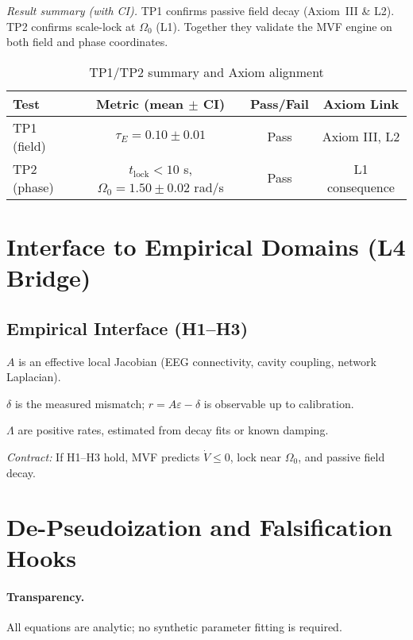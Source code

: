 \documentclass[12pt,a4paper]{article}
\begin{document}
\noindent\textit{Result summary (with CI).}
TP1 confirms passive field decay (Axiom~III \& L2). TP2 confirms scale-lock at \(\Omega_0\) (L1). Together they validate the MVF engine on both field and phase coordinates.

\begin{table}[h]
\centering
\caption{TP1/TP2 summary and Axiom alignment}
\begin{tabular}{lccc}
\toprule
Test & Metric (mean $\pm$ CI) & Pass/Fail & Axiom Link \\
\midrule
TP1 (field) & $\tau_E=0.10\pm0.01$ & Pass & Axiom III, L2 \\
TP2 (phase) & $t_{\text{lock}}<10$ s, $\Omega_0=1.50\pm0.02$ rad/s & Pass & L1 consequence \\
\bottomrule
\end{tabular}
\end{table}

\section{Interface to Empirical Domains (L4 Bridge)}
\subsection*{Empirical Interface (H1--H3)}
\begin{description}[leftmargin=1.8em]
\item[H1 (Connectivity \(A\)):] \(A\) is an effective local Jacobian (EEG connectivity, cavity coupling, network Laplacian).
\item[H2 (Deviation \(\delta\)):] \(\delta\) is the measured mismatch; \(r=A\varepsilon-\delta\) is observable up to calibration.
\item[H3 (Dissipation \(\Lambda\)):] \(\Lambda\) are positive rates, estimated from decay fits or known damping.
\end{description}
\textit{Contract:} If H1--H3 hold, MVF predicts \(\dot V\le0\), lock near \(\Omega_0\), and passive field decay.

\section{De-Pseudoization and Falsification Hooks}\label{sec:falsify}
\paragraph{Transparency.} All equations are analytic; no synthetic parameter fitting is required.
\end{document}
